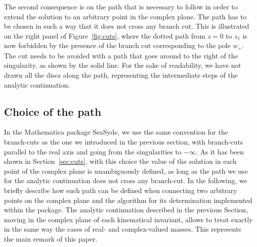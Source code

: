 \documentclass[final,1p,times]{elsarticle}
\begin{document}
The second consequence is on the path that is necessary to follow in order to extend the solution to an arbitrary point in the complex plane. The path has to be chosen in such a way that it does not cross any branch cut. This is illustrated on the right panel of Figure~\ref{fig:cuts}, where the dotted path from $z=0$ to $z_1$ is now forbidden by the presence of the branch cut corresponding to the pole $w_+$. The cut needs to be avoided with a path that goes around to the right of the singularity, as shown by the solid line. For the sake of readability, we have not drawn all the discs along the path, representing the intermediate steps of the analytic continuation.

\subsection{Choice of the path}
\label{subsec:path}
In the {\sc Mathematica} package {\sc SeaSyde}, we use the same convention for the branch-cuts as the one we introduced in the previous section, with branch-cuts parallel to the real axis and going from the singularities to $-\infty$.
As it has been shown in Section~\ref{sec:cuts}, with this choice the value of the solution in each point of the complex plane is unambiguously defined, as long as the path we use for the analytic continuation does not cross any branch-cut.
In the following, we briefly describe how such path can be defined when connecting two arbitrary points on the complex plane and the algorithm for its determination implemented within the package.
The analytic continuation described in the previous Section, moving in the complex plane of each kinematical invariant, allows to treat exactly in the same way the cases of real- and complex-valued masses. This represents the main remark of this paper.
\end{document}
